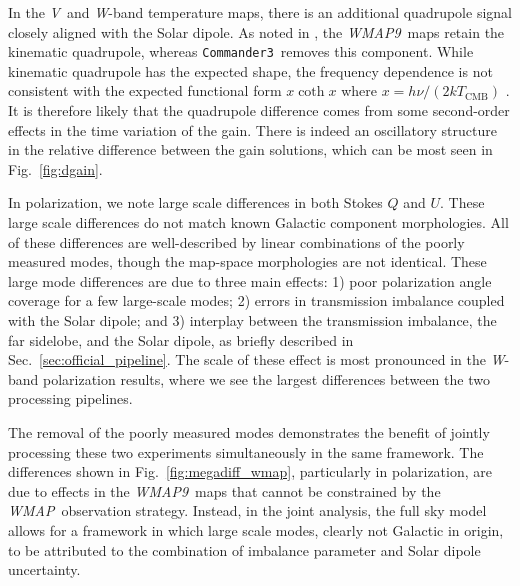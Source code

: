 \documentclass[twocolumn]{../../common/aa}
\def\WMAP{\emph{WMAP}}
\def\WMAPnine{\emph{WMAP9}}
\def\commanderthree{\texttt{Commander3}}
\newcommand{\V}[0]{\textit V}
\newcommand{\W}[0]{\textit W}
\begin{document}
In the \V\ and \W-band temperature maps, there is an additional quadrupole signal closely aligned with the Solar dipole. As noted in \citet{larson2014}, the \WMAPnine\ maps retain the kinematic quadrupole, whereas \commanderthree\ removes this component. While kinematic quadrupole has the expected shape, the frequency dependence is not consistent with the expected functional form $x\coth x$ where $x=h\nu/(2kT_\mathrm{CMB})$ \citep{Notari:2015}. It is therefore likely that the quadrupole difference comes from some second-order effects in the time variation of the gain. There is indeed an oscillatory structure in the relative difference between the gain solutions, which can be most seen in Fig.~\ref{fig:dgain}.



In polarization, we note large scale differences in both Stokes $Q$ and $U$. These large scale differences do not match known Galactic component morphologies. All of these differences are well-described by linear combinations of the  poorly measured modes, though the map-space morphologies are not identical. These large mode differences are due to three main effects: 1) poor polarization angle coverage for a few large-scale modes; 2) errors in transmission imbalance coupled with the Solar dipole; and 3) interplay between the transmission imbalance, the far sidelobe, and the Solar dipole, as briefly described in Sec.~\ref{sec:official_pipeline}. The scale of these effect is most pronounced in the \W-band polarization results, where we see the largest differences between the two processing pipelines.

The removal of the poorly measured modes demonstrates the benefit of jointly processing these two experiments simultaneously in the same framework. The differences shown in Fig.~\ref{fig:megadiff_wmap}, particularly in polarization, are due to effects in the \WMAPnine\ maps that cannot be constrained by the \WMAP\ observation strategy. 
Instead, in the joint analysis, the full sky model allows for a framework in which large scale modes,
clearly not Galactic in origin, to be attributed to the combination of imbalance parameter and Solar dipole uncertainty. 


\end{document}
